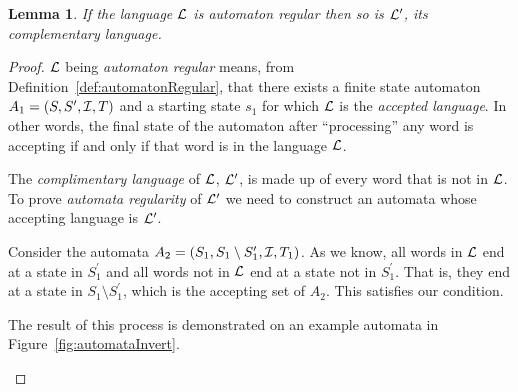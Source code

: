 \documentclass[a4paper]{article}
\newtheorem{lemma}{Lemma}[section]
\theoremstyle{definition}
\theoremstyle{definition}
\theoremstyle{definition}
\begin{document}
\begin{lemma}
    \label{lem:compLangReg}
    If the language $\mathcal{L}$ is \emph{automaton regular} then so is $\mathcal{L}^\prime$, its \emph{complementary language}.
\end{lemma}
\begin{proof}
    $\mathcal{L}$ being \emph{automaton regular} means, from Definition~\ref{def:automatonRegular}, that there exists a finite state automaton $A_1 = (S, S^\prime, \mathcal{I}, T)$ and a starting state $s_1$ for which $\mathcal{L}$ is the \emph{accepted language}. In other words, the final state of the automaton after ``processing'' any word is accepting if and only if that word is in the language $\mathcal{L}$.
    
    The \emph{complimentary language} of $\mathcal{L}$, $\mathcal{L}^\prime$, is made up of every word that is not in $\mathcal{L}$. To prove \emph{automata regularity} of $\mathcal{L}^\prime$ we need to construct an automata whose accepting language is $\mathcal{L}^\prime$.

    Consider the automata $A_2 = (S_1, S_1 \setminus S_1^\prime, \mathcal{I}, T_1)$. As we know, all words in $\mathcal{L}$ end at a state in $S_1^\prime$ and all words not in $\mathcal{L}$ end at a state not in $S_1^\prime$. That is, they end at a state in $S_1 \setminus S_1^\prime$, which is the accepting set of $A_2$. This satisfies our condition.

    The result of this process is demonstrated on an example automata in Figure~\ref{fig:automataInvert}.

    \begin{figure}[H]
        \centering
        
\end{figure}
\end{proof}
\end{document}
